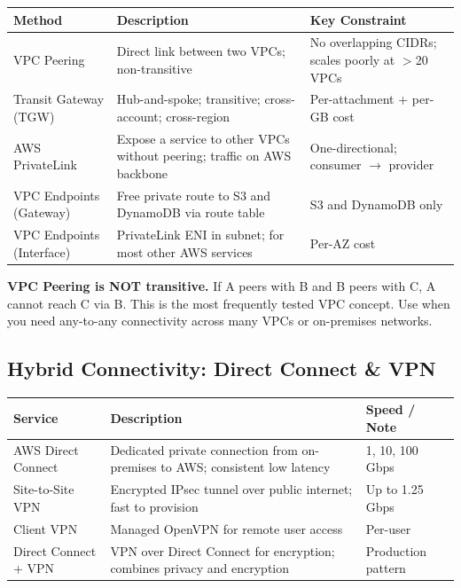 \begin{comparebox}[title={VPC Connectivity Options}]
\begin{tabular}{@{}p{3.5cm}p{5cm}p{3.5cm}@{}}
\toprule
\textbf{Method} & \textbf{Description} & \textbf{Key Constraint} \\
\midrule
VPC Peering          & Direct link between two VPCs; non-transitive         & No overlapping CIDRs; scales poorly at $>$20 VPCs \\
Transit Gateway (TGW) & Hub-and-spoke; transitive; cross-account; cross-region & Per-attachment + per-GB cost \\
AWS PrivateLink      & Expose a service to other VPCs without peering; traffic on AWS backbone & One-directional; consumer $\to$ provider \\
VPC Endpoints (Gateway) & Free private route to S3 and DynamoDB via route table & S3 and DynamoDB only \\
VPC Endpoints (Interface) & PrivateLink ENI in subnet; for most other AWS services & Per-AZ cost \\
\bottomrule
\end{tabular}
\end{comparebox}

\begin{gotcha}
\textbf{VPC Peering is NOT transitive.} If A peers with B and B peers with C, A cannot reach C via B. This is the most frequently tested VPC concept. Use  when you need any-to-any connectivity across many VPCs or on-premises networks.
\end{gotcha}

\subsection{Hybrid Connectivity: Direct Connect \& VPN}

\begin{comparebox}[title={Hybrid connectivity options}]
\begin{tabular}{@{}p{3.5cm}p{5cm}p{3.2cm}@{}}
\toprule
\textbf{Service} & \textbf{Description} & \textbf{Speed / Note} \\
\midrule
AWS Direct Connect     & Dedicated private connection from on-premises to AWS; consistent low latency    & 1, 10, 100 Gbps \\
Site-to-Site VPN       & Encrypted IPsec tunnel over public internet; fast to provision                  & Up to 1.25 Gbps  \\
Client VPN             & Managed OpenVPN for remote user access                                         & Per-user \\
Direct Connect + VPN   & VPN over Direct Connect for encryption; combines privacy and encryption         & Production pattern \\
\bottomrule
\end{tabular}
\end{comparebox}

